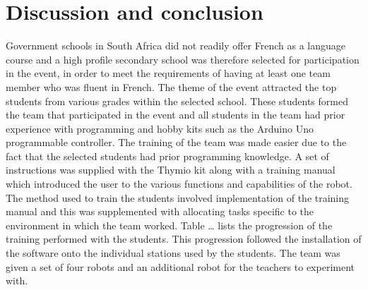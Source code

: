 \documentclass{intech-journal}
\begin{document}
\section{Discussion and conclusion}
Government schools in South Africa did not readily offer French as a language course and a high profile secondary school was therefore selected for participation in the event, in order to meet the requirements of having at least one team member who was fluent in French. The theme of the event attracted the top students from various grades within the selected school. These students formed the team that participated in the event and all students in the team had prior experience with programming and hobby kits such as the Arduino Uno programmable controller. 
The training of the team was made easier due to the fact that the selected students had prior programming knowledge. A set of instructions was supplied with the Thymio kit along with a training manual which introduced the user to the various functions and capabilities of the robot. The method used to train the students involved implementation of the training manual and this was supplemented with allocating tasks specific to the environment in which the team worked. Table … lists the progression of the training performed with the students. This progression followed the installation of the software onto the individual stations used by the students. The team was given a set of four robots and an additional robot for the teachers to experiment with. 
\end{document}
